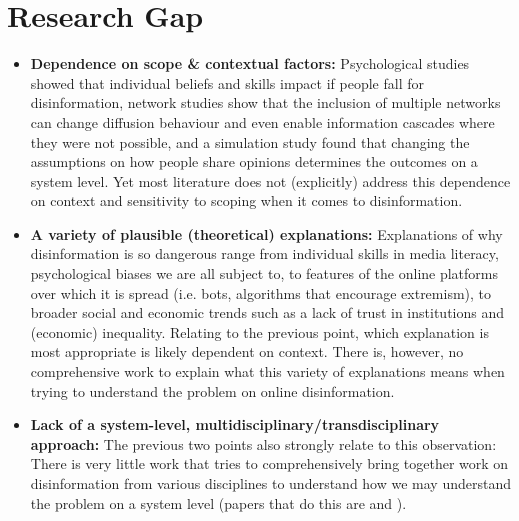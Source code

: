 \section{Research Gap}

\begin{itemize}
	\item \textbf{Dependence on scope \& contextual factors:} Psychological studies showed that individual beliefs and skills impact if people fall for disinformation, network studies show that the inclusion of multiple networks can change diffusion behaviour and even enable information cascades where they were not possible, and a simulation study found that changing the assumptions on how people share opinions determines the outcomes on a system level. Yet most literature does not (explicitly) address this dependence on context and sensitivity to scoping when it comes to disinformation. 
	\item \textbf{A variety of plausible (theoretical) explanations:} Explanations of why disinformation is so dangerous range from individual skills in media literacy, psychological biases we are all subject to, to features of the online platforms over which it is spread (i.e. bots, algorithms that encourage extremism), to broader social and economic trends such as a lack of trust in institutions and (economic) inequality. Relating to the previous point, which explanation is most appropriate is likely dependent on context. There is, however, no comprehensive work to explain what this variety of explanations means when trying to understand the problem on online disinformation.
	\item \textbf{Lack of a system-level, multidisciplinary/transdisciplinary approach:} The previous two points also strongly relate to this observation: There is very little work that tries to comprehensively bring together work on disinformation from various disciplines to understand how we may understand the problem on a system level (papers that do this are \cite{lewandowsky2017beyond} and \cite{Starbird2019}).
\end{itemize}

